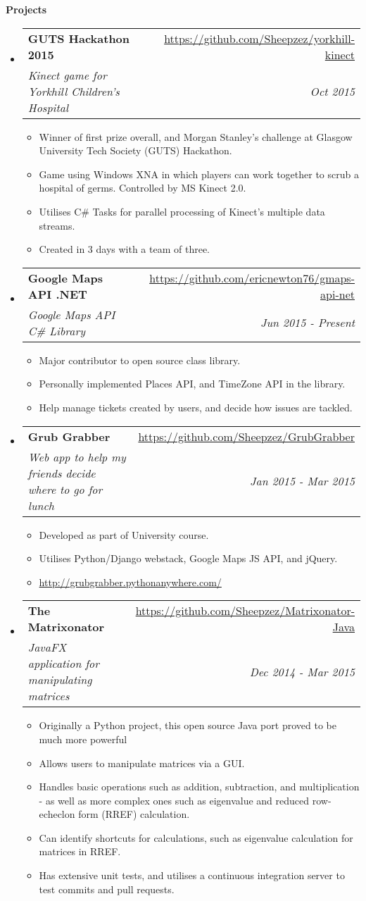 \documentclass[letterpaper,11pt]{article}
\makeatletter
\newcommand{\resitem}[1]{\item #1 \vspace{-2pt}}
\newcommand{\resheading}[1]{{\large \colorbox{mygrey}{\begin{minipage}{\textwidth}{\textbf{#1 \vphantom{p\^{E}}}}\end{minipage}}}}
\newcommand{\ressubheading}[4]{
\begin{tabular*}{7.0in}{l@{\extracolsep{\fill}}r}
		\textbf{#1} & #2 \\
		\textit{#3} & \textit{#4} \\
\end{tabular*}\vspace{-6pt}}
\makeatother
\begin{document}
\resheading{Projects}
\begin{itemize}
\item
	\ressubheading{GUTS Hackathon 2015}{\url{https://github.com/Sheepzez/yorkhill-kinect}}
	{Kinect game for Yorkhill Children's Hospital}{Oct 2015}
	\begin{itemize}
		\resitem{Winner of first prize overall, and Morgan Stanley's challenge at Glasgow University Tech Society (GUTS) Hackathon.}
		\resitem{Game using Windows XNA in which players can work together to scrub a hospital of germs. Controlled by MS Kinect 2.0.}
		\resitem{Utilises C\# Tasks for parallel processing of Kinect's multiple data streams.}
		\resitem{Created in 3 days with a team of three.}
	\end{itemize}

\item
	\ressubheading{Google Maps API .NET}{\url{https://github.com/ericnewton76/gmaps-api-net}}
	{Google Maps API C\# Library}{Jun 2015 - Present}
	\begin{itemize}
		\resitem{Major contributor to open source class library.}
		\resitem{Personally implemented Places API, and TimeZone API in the library.}
		\resitem{Help manage tickets created by users, and decide how issues are tackled.}
	\end{itemize}

\item
	\ressubheading{Grub Grabber}{\url{https://github.com/Sheepzez/GrubGrabber}}
	{Web app to help my friends decide where to go for lunch}{Jan 2015 - Mar 2015}
	\begin{itemize}
		\resitem{Developed as part of University course.}
		\resitem{Utilises Python/Django webstack, Google Maps JS API, and jQuery.}
		\resitem{\url{http://grubgrabber.pythonanywhere.com/}}
	\end{itemize}

\item
	\ressubheading{The Matrixonator}{\url{https://github.com/Sheepzez/Matrixonator-Java}}
	{JavaFX application for manipulating matrices}{Dec 2014 - Mar 2015}
	\begin{itemize}
		\resitem{Originally a Python project, this open source Java port proved to be much more powerful}
		\resitem{Allows users to manipulate matrices via a GUI.}
		\resitem{Handles basic operations such as addition, subtraction, and multiplication - as well as
		more complex ones such as eigenvalue and reduced row-echeclon form (RREF) calculation.}
		\resitem{Can identify shortcuts for calculations, such as eigenvalue calculation for matrices in RREF.}
		\resitem{Has extensive unit tests, and utilises a continuous integration server to test commits and pull requests.}
	\end{itemize}

\end{itemize}
\end{document}
